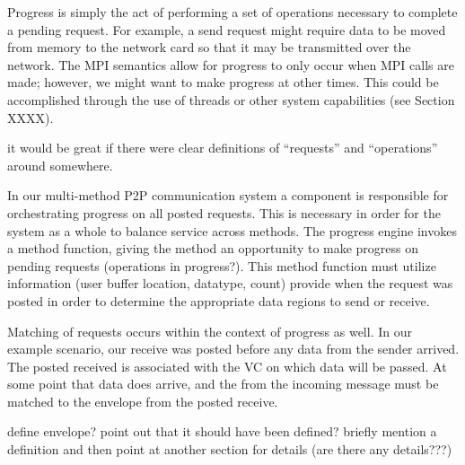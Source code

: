 Progress is simply the act of performing a set of operations necessary to
complete a pending request.  For example, a send request might require data to
be moved from memory to the network card so that it may be transmitted over the
network.
%
The MPI semantics allow for progress to only occur when MPI calls
are made; however, we might want to make progress at other times.  This could
be accomplished through the use of threads or other system capabilities (see
Section XXXX).

\begin{cmt}
  it would be great if there were clear definitions of ``requests'' and
  ``operations'' around somewhere.
\end{cmt}

In our multi-method P2P communication system a  component
is responsible for orchestrating progress on all posted requests.  This is
necessary in order for the system as a whole to balance service across methods.
The progress engine invokes a method function, giving the method an opportunity
to make progress on pending requests (operations in progress?).  This method
function must utilize  information (user buffer location,
datatype, count) provide when the request was posted in order to determine the
appropriate data regions to send or receive.

Matching of requests occurs within the context of progress as well.  In our
example scenario, our receive was posted before any data from the sender
arrived.  The posted received is associated with the VC on which data will be
passed.  At some point that data does arrive, and the  from
the incoming message must be matched to the envelope from the posted receive.

\begin{cmt}
  define envelope?  point out that it should have been defined?  briefly
  mention a definition and then point at another section for details (are there
  any details???)
\end{cmt}

% 

